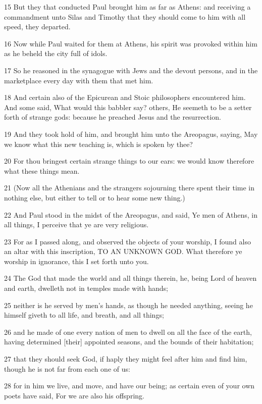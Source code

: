 \par 15 But they that conducted Paul brought him as far as Athens: and receiving a commandment unto Silas and Timothy that they should come to him with all speed, they departed.
\par 16 Now while Paul waited for them at Athens, his spirit was provoked within him as he beheld the city full of idols.
\par 17 So he reasoned in the synagogue with Jews and the devout persons, and in the marketplace every day with them that met him.
\par 18 And certain also of the Epicurean and Stoic philosophers encountered him. And some said, What would this babbler say? others, He seemeth to be a setter forth of strange gods: because he preached Jesus and the resurrection.
\par 19 And they took hold of him, and brought him unto the Areopagus, saying, May we know what this new teaching is, which is spoken by thee?
\par 20 For thou bringest certain strange things to our ears: we would know therefore what these things mean.
\par 21 (Now all the Athenians and the strangers sojourning there spent their time in nothing else, but either to tell or to hear some new thing.)
\par 22 And Paul stood in the midst of the Areopagus, and said, Ye men of Athens, in all things, I perceive that ye are very religious.
\par 23 For as I passed along, and observed the objects of your worship, I found also an altar with this inscription, TO AN UNKNOWN GOD. What therefore ye worship in ignorance, this I set forth unto you.
\par 24 The God that made the world and all things therein, he, being Lord of heaven and earth, dwelleth not in temples made with hands;
\par 25 neither is he served by men's hands, as though he needed anything, seeing he himself giveth to all life, and breath, and all things;
\par 26 and he made of one every nation of men to dwell on all the face of the earth, having determined [their] appointed seasons, and the bounds of their habitation;
\par 27 that they should seek God, if haply they might feel after him and find him, though he is not far from each one of us:
\par 28 for in him we live, and move, and have our being; as certain even of your own poets have said, For we are also his offspring.
